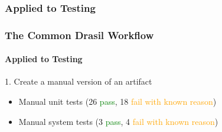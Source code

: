 \subsubsection*{Applied to Testing}

\begin{frame}
    \frametitle{The Common Drasil Workflow}
    \framesubtitle{Applied to Testing}

    1. Create a manual version of an artifact
    \begin{itemize}
        \item Manual unit tests (26 \textcolor{green}{pass}, 18 \textcolor{orange}{fail with known reason})
        \item<5-|handout:4> Manual system tests (3 \textcolor{green}{pass}, 4 \textcolor{orange}{fail with known reason})
    \end{itemize}

\end{frame}
